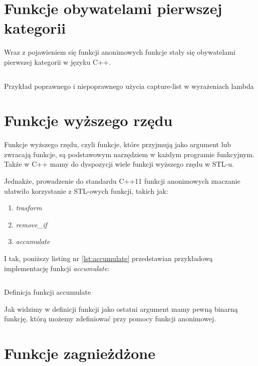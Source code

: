 \documentclass{pracamgr}
\begin{document}
\section{Funkcje obywatelami pierwszej kategorii}

Wraz z pojawieniem się funkcji anonimowych funkcje stały się obywatelami pierwszej kategorii w języku C++.

\begin{listing}[ht]
\inputminted[mathescape, linenos, numbersep=5pt, bgcolor=bg, rulecolor=\color{darkgray}, frame=lines, framesep=2mm]{cpp}{firstCategory.cpp}
\caption{Przykład poprawnego i niepoprawnego użycia capture-list w wyrażeniach lambda}
\label{listing:3}
\end{listing}






\section{Funkcje wyższego rzędu}


Funkcje wyższego rzędu, czyli funkcje, które przyjmują jako argument lub zwracają funkcje, są 
podstawowym narzędziem w każdym programie funkcyjnym. 
Także w C++ mamy do dyspozycji wiele funkcji wyższego rzędu w STL-u.

Jednakże, prowadzenie do standardu C++11 funkcji anonimowych znaczanie ułatwiło korzystanie z STL-owych funkcji, 
takich jak:
\begin{enumerate}
\item \textit{trasform}
\item \textit{remove\_if}
\item \textit{accumulate}
\end{enumerate}

\noindent
I tak, poniższy listing nr \ref{lst:accumulate} przedstawian przykładową implementację funkcji \textit{accumulate}:

\begin{listing}[H]
\inputminted[mathescape, linenos, numbersep=5pt, bgcolor=bg, rulecolor=\color{darkgray}, frame=lines, framesep=2mm]{cpp}{accumulate.cpp}
\caption{Definicja funkcji accumulate}
\label{lst:accumulate}
\end{listing}


Jak widzimy w definicji funkcji jako ostatni argument mamy pewną binarną funkcję, którą możemy
zdefiniować przy pomocy funkcji anonimowej.

\section{Funkcje zagnieżdżone}
\end{document}
